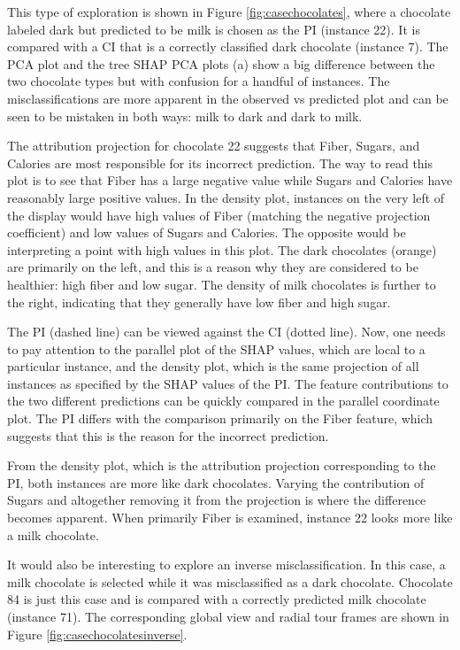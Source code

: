 \documentclass[11pt,twoside]{article}
\begin{document}
This type of exploration is shown in Figure \ref{fig:casechocolates}, where a chocolate labeled dark but predicted to be milk is chosen as the PI (instance 22). It is compared with a CI that is a correctly classified dark chocolate (instance 7). The PCA plot and the tree SHAP PCA plots (a) show a big difference between the two chocolate types but with confusion for a handful of instances. The misclassifications are more apparent in the observed vs predicted plot and can be seen to be mistaken in both ways: milk to dark and dark to milk.

The attribution projection for chocolate 22 suggests that Fiber, Sugars, and Calories are most responsible for its incorrect prediction. The way to read this plot is to see that Fiber has a large negative value while Sugars and Calories have reasonably large positive values. In the density plot, instances on the very left of the display would have high values of Fiber (matching the negative projection coefficient) and low values of Sugars and Calories. The opposite would be interpreting a point with high values in this plot. The dark chocolates (orange) are primarily on the left, and this is a reason why they are considered to be healthier: high fiber and low sugar. The density of milk chocolates is further to the right, indicating that they generally have low fiber and high sugar.

The PI (dashed line) can be viewed against the CI (dotted line). Now, one needs to pay attention to the parallel plot of the SHAP values, which are local to a particular instance, and the density plot, which is the same projection of all instances as specified by the SHAP values of the PI. The feature contributions to the two different predictions can be quickly compared in the parallel coordinate plot. The PI differs with the comparison primarily on the Fiber feature, which suggests that this is the reason for the incorrect prediction.

From the density plot, which is the attribution projection corresponding to the PI, both instances are more like dark chocolates. Varying the contribution of Sugars and altogether removing it from the projection is where the difference becomes apparent. When primarily Fiber is examined, instance 22 looks more like a milk chocolate.

It would also be interesting to explore an inverse misclassification. In this case, a milk chocolate is selected while it was misclassified as a dark chocolate. Chocolate 84 is just this case and is compared with a correctly predicted milk chocolate (instance 71). The corresponding global view and radial tour frames are shown in Figure \ref{fig:casechocolatesinverse}.
\end{document}
